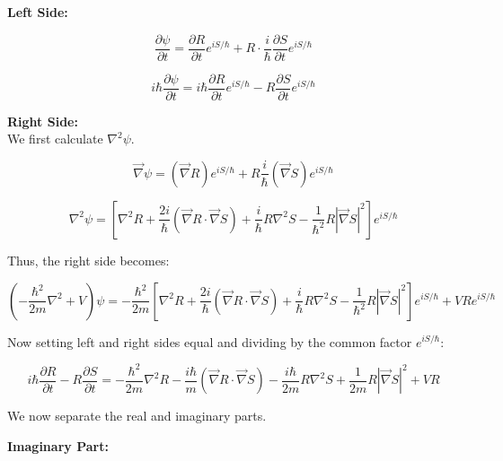 \textbf{Left Side:}

\begin{equation}
    \frac{\partial \psi}{\partial t} = \frac{\partial R}{\partial t} e^{iS/\hbar} + R \cdot \frac{i}{\hbar} \frac{\partial S}{\partial t} e^{iS/\hbar}
\end{equation}

\begin{equation}
    i\hbar \frac{\partial \psi}{\partial t} = i\hbar \frac{\partial R}{\partial t} e^{iS/\hbar} - R \frac{\partial S}{\partial t} e^{iS/\hbar}
\end{equation}

\textbf{Right Side:}\\
We first calculate $\nabla^2 \psi$.

\begin{equation}
    \vec{\nabla} \psi = (\vec{\nabla} R) e^{iS/\hbar} + R \frac{i}{\hbar} (\vec{\nabla} S) e^{iS/\hbar}
\end{equation}

\begin{equation}
    \nabla^2 \psi = \left[ \nabla^2 R + \frac{2i}{\hbar} (\vec{\nabla} R \cdot \vec{\nabla} S) + \frac{i}{\hbar} R \nabla^2 S - \frac{1}{\hbar^2} R \left| \vec{\nabla} S \right|^2 \right] e^{iS/\hbar}
\end{equation}

Thus, the right side becomes:

\begin{equation}
    \left( -\frac{\hbar^2}{2m} \nabla^2 + V \right) \psi = -\frac{\hbar^2}{2m} \left[ \nabla^2 R + \frac{2i}{\hbar} (\vec{\nabla} R \cdot \vec{\nabla} S) + \frac{i}{\hbar} R \nabla^2 S - \frac{1}{\hbar^2} R \left| \vec{\nabla} S \right|^2 \right] e^{iS/\hbar} + V R e^{iS/\hbar}
\end{equation}

Now setting left and right sides equal and dividing by the common factor $e^{iS/\hbar}$:

\begin{equation}
    i\hbar \frac{\partial R}{\partial t} - R \frac{\partial S}{\partial t} = -\frac{\hbar^2}{2m} \nabla^2 R - \frac{i\hbar}{m} (\vec{\nabla} R \cdot \vec{\nabla} S) - \frac{i\hbar}{2m} R \nabla^2 S + \frac{1}{2m} R \left| \vec{\nabla} S \right|^2 + V R
\end{equation}

We now separate the real and imaginary parts.

\textbf{Imaginary Part:}

